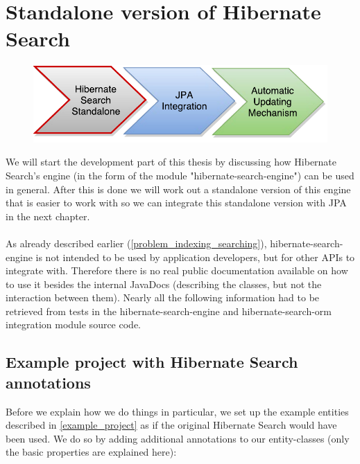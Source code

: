 ~
\pagebreak

\section{Standalone version of Hibernate Search} \label{standalone_chapter}

\begin{figure}[ht]
	\centering
	\includegraphics[scale=0.75]{images/timeline_genericjpa_first.pdf}
	\label{project_timeline_first}
\end{figure}
\noindent
We will start the development part of this thesis by discussing how Hibernate Search's engine (in the form of the module "hibernate-search-engine") can be used in general. After this is done we will work out a standalone version of this engine that is easier to work with so we can integrate this standalone version with JPA in the next chapter.
\\\\
As already described earlier (\ref{problem_indexing_searching}), hibernate-search-engine is not intended to be used by application developers, but for other APIs to integrate with. Therefore there is no real public documentation available on how to use it besides the internal JavaDocs (describing the classes, but not the interaction between them). Nearly all the following information had to be retrieved from tests in the hibernate-search-engine and hibernate-search-orm integration module source code.

\pagebreak

\subsection{Example project with Hibernate Search annotations} \label{setting_up_example_project}

Before we explain how we do things in particular, we set up the example entities described in \ref{example_project} as if the original Hibernate Search would have been used. We do so by adding additional annotations to our entity-classes (only the basic properties are explained here):

